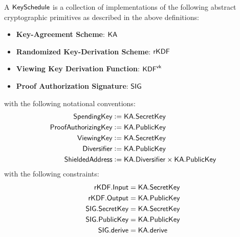 \begin{definition}
    A ${\textsf{KeySchedule}}$ is a collection of implementations of the following abstract cryptographic primitives as described in the above definitions:
    \begin{itemize}
        \item \textbf{Key-Agreement Scheme}: ${\textsf{KA}}$
        \item \textbf{Randomized Key-Derivation Scheme}: ${\textsf{rKDF}}$
        \item \textbf{Viewing Key Derivation Function}: ${\textsf{KDF}}^{\textsf{vk}}$
        \item \textbf{Proof Authorization Signature}: ${\textsf{SIG}}$
    \end{itemize}
    with the following notational conventions:
    \begin{align*}
        {\textsf{SpendingKey}}         &:= {\textsf{KA}}.{\textsf{SecretKey}} \\
        {\textsf{ProofAuthorizingKey}} &:= {\textsf{KA}}.{\textsf{PublicKey}} \\
        {\textsf{ViewingKey}}          &:= {\textsf{KA}}.{\textsf{SecretKey}} \\
        {\textsf{Diversifier}}         &:= {\textsf{KA}}.{\textsf{PublicKey}} \\
        {\textsf{ShieldedAddress}}     &:= {\textsf{KA}}.{\textsf{Diversifier}} \times {\textsf{KA}}.{\textsf{PublicKey}}
    \end{align*}
    with the following constraints:
    \begin{align*}
        {\textsf{rKDF}}.{\textsf{Input}}    &= {\textsf{KA}}.{\textsf{SecretKey}} \\
        {\textsf{rKDF}}.{\textsf{Output}}   &= {\textsf{KA}}.{\textsf{PublicKey}} \\
        {\textsf{SIG}}.{\textsf{SecretKey}} &= {\textsf{KA}}.{\textsf{SecretKey}} \\
        {\textsf{SIG}}.{\textsf{PublicKey}} &= {\textsf{KA}}.{\textsf{PublicKey}} \\
        {\textsf{SIG}}.{\textsf{derive}}    &= {\textsf{KA}}.{\textsf{derive}}
    \end{align*}
\end{definition}


